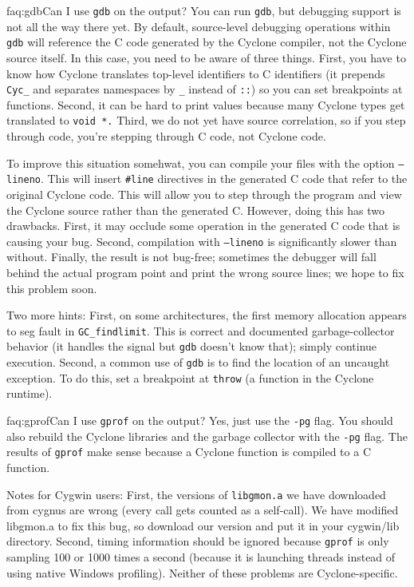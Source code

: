 \begin{faqa}{faq:gdb}{Can I use \texttt{gdb} on the output?}
You can run {\tt gdb}, but debugging support is not all the way there
yet.  By default, source-level debugging operations within {\tt gdb}
will reference the C code generated by the Cyclone compiler, not the
Cyclone source itself.  In this case, you need to be aware of three
things.  First, you have to know how Cyclone translates top-level
identifiers to C identifiers (it prepends \texttt{Cyc_} and separates
namespaces by \texttt{_} instead of \texttt{::}) so you can set
breakpoints at functions.  Second, it can be hard to print values
because many Cyclone types get translated to \texttt{void *.}  Third,
we do not yet have source correlation, so if you step through code,
you're stepping through C code, not Cyclone code.

To improve this situation somehwat, you can compile your files with the
option \texttt{--lineno}.  This will insert \texttt{\#line} directives in the
generated C code that refer to the original Cyclone code.  This will allow
you to step through the program and view the Cyclone source rather than the
generated C.  However, doing this has two drawbacks.  First, it may occlude
some operation in the generated C code that is causing your bug.  Second,
compilation with \texttt{--lineno} is significantly slower than without.
Finally, the result is not bug-free; sometimes the debugger will fall behind
the actual program point and print the wrong source lines; we hope to fix
this problem soon.

Two more hints: First, on some architectures, the first memory
allocation appears to seg fault in \texttt{GC_findlimit}.  This is
correct and documented garbage-collector behavior (it handles the
signal but \texttt{gdb} doesn't know that); simply continue execution.
Second, a common use of \texttt{gdb} is to find the location of an
uncaught exception.  To do this, set a breakpoint at \texttt{throw} (a
function in the Cyclone runtime).
\end{faqa}

\begin{faqa}{faq:gprof}{Can I use \texttt{gprof} on the output?}
Yes, just use the \texttt{-pg} flag.  You should also rebuild the
Cyclone libraries and the garbage collector with the \texttt{-pg}
flag.  The results of \texttt{gprof} make sense because a Cyclone
function is compiled to a C function.

Notes for Cygwin users: First, the versions of \texttt{libgmon.a} we
have downloaded from cygnus are wrong (every call gets counted as a
self-call).  We have modified libgmon.a to fix this bug, so download
our version and put it in your cygwin/lib directory.  Second, timing
information should be ignored because \texttt{gprof} is only sampling
100 or 1000 times a second (because it is launching threads instead of
using native Windows profiling).  Neither of these problems are
Cyclone-specific.
\end{faqa}

